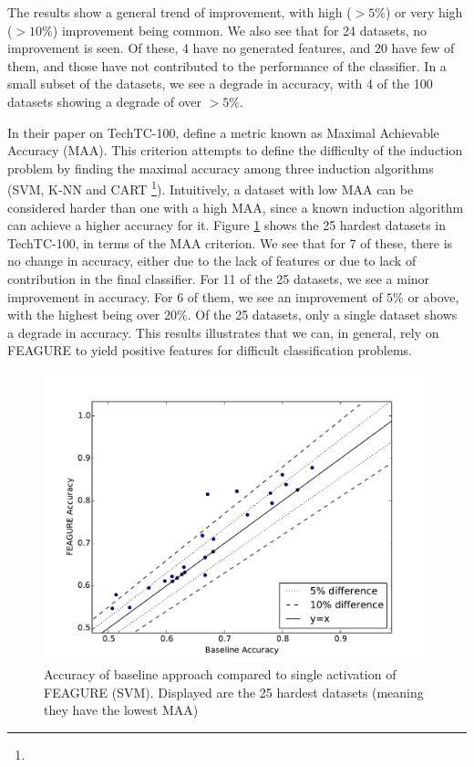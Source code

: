 \documentclass[twoside,11pt]{article}
\theoremstyle{definition}
\begin{document}
The results show a general trend of improvement, with high ($> 5\%$) or very high ($>10\%$) improvement being common. We also see that for 24 datasets, no improvement is seen. Of these, 4 have no generated features, and 20 have few of them, and those have not contributed to the performance of the classifier. In a small subset of the datasets, we see a degrade in accuracy, with 4 of the 100 datasets showing a degrade of over $> 5\%$. 

In their paper on TechTC-100,  define a metric known as Maximal Achievable Accuracy (MAA). This criterion attempts to define the difficulty of the induction problem by finding the maximal accuracy among three induction algorithms (SVM, K-NN and CART \footnote{}).
Intuitively, a dataset with low MAA can be considered harder than one with a high MAA, since a known induction algorithm can achieve a higher accuracy for it.
Figure \ref{fig:25best} shows the 25 hardest datasets in TechTC-100, in terms of the MAA criterion. 
We see that for 7 of these, there is no change in accuracy, either due to the lack of features or due to lack of contribution in the final classifier.
For 11 of the 25 datasets, we see a minor improvement in accuracy. For 6 of them, we see an improvement of $5\%$ or above, with the highest being over $20\%$.
Of the 25 datasets, only a single dataset shows a degrade in accuracy. This results illustrates that we can, in general, rely on FEAGURE to yield positive features for difficult classification problems.

\begin{figure}
	\centering
	\includegraphics[width=0.8\linewidth]{new_svm_10_25hardest}
	\caption{Accuracy of
		baseline approach compared to single activation of FEAGURE (SVM). Displayed are the 25 hardest datasets (meaning they have the lowest MAA)}
	\label{fig:25best}
\end{figure}
\end{document}
